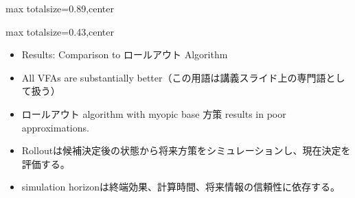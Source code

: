 \begin{minipage}[t]{0.58\textwidth}
\begin{adjustbox}{max totalsize={\textwidth}{0.89\textheight},center}
\begin{minipage}{\textwidth}
\end{minipage}
\end{adjustbox}
\end{minipage}


\clearpage
{}
\begin{minipage}[t]{0.405\textwidth}
\begin{adjustbox}{max totalsize={\textwidth}{0.43\textheight},center}
\begin{minipage}{\textwidth}\scriptsize
{}\begin{itemize}
\item Results: Comparison to ロールアウト Algorithm
\item All VFAs are substantially better（この用語は講義スライド上の専門語として扱う）
\item ロールアウト algorithm with myopic base 方策 results in poor approximations.
\end{itemize}\begin{itemize}
\item Rolloutは候補決定後の状態から将来方策をシミュレーションし、現在決定を評価する。
\item simulation horizonは終端効果、計算時間、将来情報の信頼性に依存する。
\end{itemize}
\end{minipage}
\end{adjustbox}
\end{minipage}\hfill
